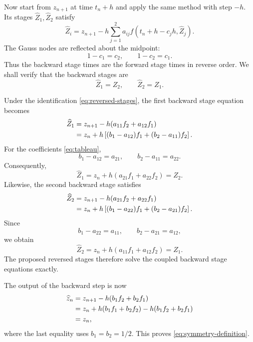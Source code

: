 \documentclass[11pt,a4paper]{article}
\begin{document}
Now start from $z_{n+1}$ at time $t_n+h$ and apply the same method with step
$-h$.  Its stages $\widehat Z_1,\widehat Z_2$ satisfy
\begin{equation}
 \widehat Z_i=z_{n+1}
 -h\sum_{j=1}^2a_{ij}
 f(t_n+h-c_jh,\widehat Z_j).
 \label{eq:backward-stage-equations}
\end{equation}
The Gauss nodes are reflected about the midpoint:
\begin{equation}
 1-c_1=c_2,
 \qquad
 1-c_2=c_1.
 \label{eq:reflected-nodes}
\end{equation}
Thus the backward stage times are the forward stage times in reverse order.
We shall verify that the backward stages are
\begin{equation}
 \boxed{
 \widehat Z_1=Z_2,
 \qquad
 \widehat Z_2=Z_1.
 }
 \label{eq:reversed-stages}
\end{equation}

Under the identification \eqref{eq:reversed-stages}, the first backward stage
equation becomes
\begin{align}
 \widehat Z_1
 &=z_{n+1}-h(a_{11}f_2+a_{12}f_1)
 \notag\\
 &=z_n+h\left[(b_1-a_{12})f_1+(b_2-a_{11})f_2\right].
 \label{eq:first-backward-stage}
\end{align}
For the coefficients \eqref{eq:tableau},
\begin{equation}
 b_1-a_{12}=a_{21},
 \qquad
 b_2-a_{11}=a_{22}.
 \label{eq:first-reversal-identities}
\end{equation}
Consequently,
\[
 \widehat Z_1=z_n+h(a_{21}f_1+a_{22}f_2)=Z_2.
\]
Likewise, the second backward stage satisfies
\begin{align}
 \widehat Z_2
 &=z_{n+1}-h(a_{21}f_2+a_{22}f_1)
 \notag\\
 &=z_n+h\left[(b_1-a_{22})f_1+(b_2-a_{21})f_2\right].
 \label{eq:second-backward-stage}
\end{align}
Since
\begin{equation}
 b_1-a_{22}=a_{11},
 \qquad
 b_2-a_{21}=a_{12},
 \label{eq:second-reversal-identities}
\end{equation}
we obtain
\[
 \widehat Z_2=z_n+h(a_{11}f_1+a_{12}f_2)=Z_1.
\]
The proposed reversed stages therefore solve the coupled backward stage
equations exactly.

\clearpage

The output of the backward step is now
\begin{align}
 \widehat z_n
 &=z_{n+1}-h(b_1f_2+b_2f_1)
 \notag\\
 &=z_n+h(b_1f_1+b_2f_2)-h(b_1f_2+b_2f_1)
 \notag\\
 &=z_n,
 \label{eq:backward-recovers-input}
\end{align}
where the last equality uses $b_1=b_2=1/2$.  This proves
\eqref{eq:symmetry-definition}.
\end{document}
